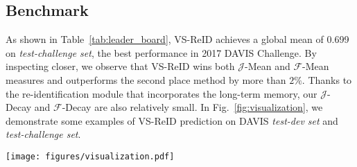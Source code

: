 \subsection{Benchmark}
As shown in Table~\ref{tab:leader_board}, VS-ReID achieves a global mean of 0.699 on \emph{test-challenge set}, the best performance in 2017 DAVIS Challenge. 
%
By inspecting closer, we observe that VS-ReID wins both $\mathcal{J}$-Mean and $\mathcal{F}$-Mean measures and outperforms the second place method by more than $2\%$.
%
Thanks to the re-identification module that incorporates the long-term memory, our $\mathcal{J}$-Decay and $\mathcal{F}$-Decay are also relatively small.
%
In Fig.~\ref{fig:visualization}, we demonstrate some examples of VS-ReID prediction on DAVIS \emph{test-dev set} and \emph{test-challenge set}.

\begin{figure*}[t]
	\centering
	\texttt{[image: figures/visualization.pdf]}
	\caption{\small{Qualitative results of our VS-ReID model on DAVIS 2017 \textit{test-dev set} and \textit{test-challenge set}.}}
	\label{fig:visualization}
	\vspace{-12pt}
\end{figure*}
